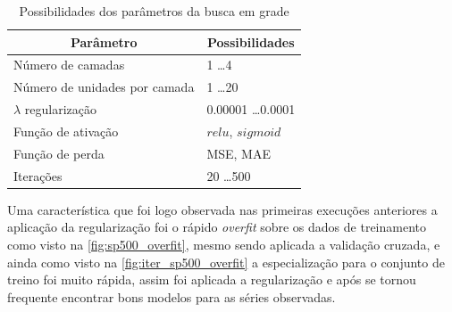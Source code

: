 \documentclass[
    12pt,
    oneside,
    a4paper,
    english,
    brazil
]{abntex2}
\begin{document}
\begin{table}[ht]
\centering
\caption{Possibilidades dos parâmetros da busca em grade}\label{tab:gridsearch}
\begin{tabular}{l l}
\multicolumn{1}{c}{Parâmetro}        & \multicolumn{1}{c}{Possibilidades}  \\
    \toprule
    Número de camadas                & 1 \ldots 4                          \\
    Número de unidades por camada    & 1 \ldots 20                         \\
    $\lambda$ regularização          & 0.00001 \ldots 0.0001               \\
    Função de ativação               & $relu$, $sigmoid$                   \\
    Função de perda                  & MSE, MAE                            \\
    Iterações                        & 20 \ldots 500
\end{tabular}
\end{table}

Uma característica que foi logo  observada nas primeiras execuções anteriores a
aplicação  da regularização  foi o  rápido \textit{overfit}  sobre os  dados de
treinamento como  visto na \autoref{fig:sp500_overfit}, mesmo  sendo aplicada a
validação  cruzada, e  ainda como  visto na  \autoref{fig:iter_sp500_overfit} a
especialização para o conjunto de treino foi muito rápida, assim foi aplicada a
regularização e após se tornou frequente  encontrar bons modelos para as séries
observadas.
\end{document}
